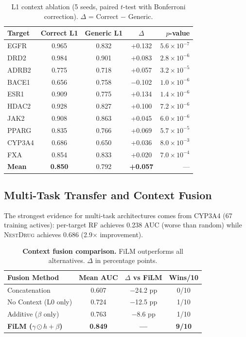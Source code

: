 \documentclass{article}
\newcommand{\methodname}{\textsc{NestDrug}}
\begin{document}
\begin{table}[t]
\vspace{-2mm}
\caption{L1 context ablation (5 seeds, paired $t$-test with Bonferroni correction). $\Delta$ = Correct $-$ Generic.}
\label{tab:l1_ablation}
\centering
\small
\begin{tabular*}{\textwidth}{@{\extracolsep{\fill}}lcccr@{}}
\toprule
Target & Correct L1 & Generic L1 & $\Delta$ & $p$-value \\
\midrule
EGFR & 0.965 & 0.832 & +0.132 & $5.6 \times 10^{-7}$ \\
DRD2 & 0.984 & 0.901 & +0.083 & $2.8 \times 10^{-6}$ \\
ADRB2 & 0.775 & 0.718 & +0.057 & $3.2 \times 10^{-5}$ \\
BACE1 & 0.656 & 0.758 & $-$0.102 & $1.0 \times 10^{-6}$ \\
ESR1 & 0.909 & 0.775 & +0.134 & $1.4 \times 10^{-6}$ \\
HDAC2 & 0.928 & 0.827 & +0.100 & $7.2 \times 10^{-6}$ \\
JAK2 & 0.908 & 0.863 & +0.045 & $6.0 \times 10^{-6}$ \\
PPARG & 0.835 & 0.766 & +0.069 & $5.7 \times 10^{-5}$ \\
CYP3A4 & 0.686 & 0.650 & +0.036 & $8.0 \times 10^{-3}$ \\
FXA & 0.854 & 0.833 & +0.020 & $7.0 \times 10^{-4}$ \\
\midrule
\textbf{Mean} & \textbf{0.850} & 0.792 & \textbf{+0.057} & --- \\
\bottomrule
\end{tabular*}
\vspace{-2mm}
\end{table}

\subsection{Multi-Task Transfer and Context Fusion}

The strongest evidence for multi-task architectures comes from CYP3A4 (67 training actives): per-target RF achieves 0.238 AUC (worse than random) while \methodname{} achieves 0.686 (2.9$\times$ improvement).

\begin{table}[h]
\vspace{-2mm}
\caption{\textbf{Context fusion comparison.} FiLM outperforms all alternatives. $\Delta$ in percentage points.}
\label{tab:fusion}
\centering
\small
\begin{tabular}{@{}lccc@{}}
\toprule
\textbf{Fusion Method} & \textbf{Mean AUC} & \textbf{$\Delta$ vs FiLM} & \textbf{Wins/10} \\
\midrule
Concatenation & 0.607 & $-$24.2 pp & 0/10 \\
No Context (L0 only) & 0.724 & $-$12.5 pp & 1/10 \\
Additive ($\beta$ only) & 0.763 & $-$8.6 pp & 1/10 \\
\textbf{FiLM ($\gamma \odot h + \beta$)} & \textbf{0.849} & \textbf{---} & \textbf{9/10} \\
\bottomrule
\end{tabular}
\vspace{-2mm}
\end{table}
\end{document}
